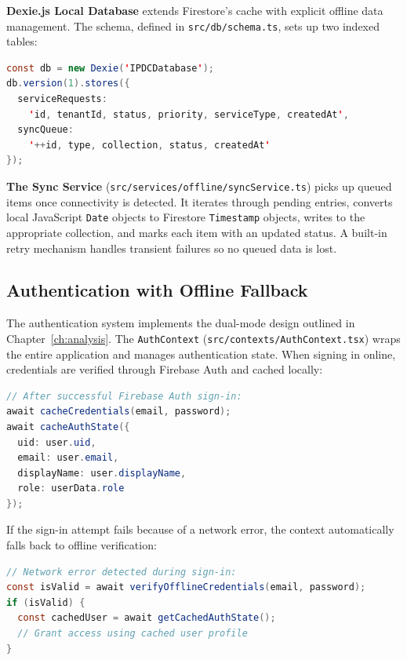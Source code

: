\textbf{Dexie.js Local Database} extends Firestore's cache with explicit offline data management. The schema, defined in \texttt{src/db/schema.ts}, sets up two indexed tables:

\begin{lstlisting}[language=Java, caption={Dexie.js Database Schema}, label={lst:dexie-schema}]
const db = new Dexie('IPDCDatabase');
db.version(1).stores({
  serviceRequests:
    'id, tenantId, status, priority, serviceType, createdAt',
  syncQueue:
    '++id, type, collection, status, createdAt'
});
\end{lstlisting}

\textbf{The Sync Service} (\texttt{src/services/offline/syncService.ts}) picks up queued items once connectivity is detected. It iterates through pending entries, converts local JavaScript \texttt{Date} objects to Firestore \texttt{Timestamp} objects, writes to the appropriate collection, and marks each item with an updated status. A built-in retry mechanism handles transient failures so no queued data is lost.

\subsection{Authentication with Offline Fallback}

The authentication system implements the dual-mode design outlined in Chapter~\ref{ch:analysis}. The \texttt{AuthContext} (\texttt{src/contexts/AuthContext.tsx}) wraps the entire application and manages authentication state. When signing in online, credentials are verified through Firebase Auth and cached locally:

\begin{lstlisting}[language=Java, caption={Credential Caching After Online Authentication}, label={lst:auth-cache}]
// After successful Firebase Auth sign-in:
await cacheCredentials(email, password);
await cacheAuthState({
  uid: user.uid,
  email: user.email,
  displayName: user.displayName,
  role: userData.role
});
\end{lstlisting}

If the sign-in attempt fails because of a network error, the context automatically falls back to offline verification:

\begin{lstlisting}[language=Java, caption={Offline Authentication Fallback}, label={lst:auth-offline}]
// Network error detected during sign-in:
const isValid = await verifyOfflineCredentials(email, password);
if (isValid) {
  const cachedUser = await getCachedAuthState();
  // Grant access using cached user profile
}
\end{lstlisting}

